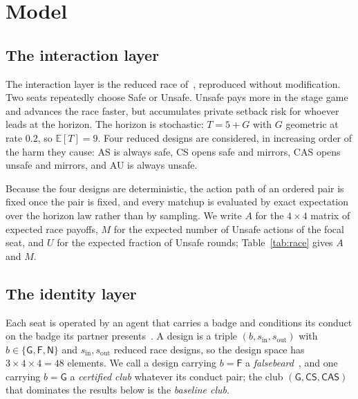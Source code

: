\documentclass[preprint,12pt]{elsarticle}
\theoremstyle{plain}
\theoremstyle{definition}
\newcommand{\AS}{\textsf{AS}}
\newcommand{\CS}{\textsf{CS}}
\newcommand{\CAS}{\textsf{CAS}}
\newcommand{\AU}{\textsf{AU}}
\begin{document}
\section{Model}
\label{sec:model}

\subsection{The interaction layer}
\label{sec:race}

The interaction layer is the reduced race of~\citet{domingos2026falling},
reproduced without modification. Two seats repeatedly choose Safe or Unsafe.
Unsafe pays more in the stage game and advances the race faster, but accumulates
private setback risk for whoever leads at the horizon. The horizon is
stochastic: $T = 5 + G$ with $G$ geometric at rate $0.2$, so $\mathbb{E}[T] = 9$.
Four reduced designs are considered, in increasing order of the harm they cause:
\AS{} is always safe, \CS{} opens safe and mirrors, \CAS{} opens unsafe and
mirrors, and \AU{} is always unsafe.

Because the four designs are deterministic, the action path of an ordered pair
is fixed once the pair is fixed, and every matchup is evaluated by exact
expectation over the horizon law rather than by sampling. We write $A$ for the
$4 \times 4$
matrix of expected race payoffs, $M$ for the expected number of Unsafe actions
of the focal seat, and $U$ for the expected fraction of Unsafe rounds;
Table~\ref{tab:race} gives $A$ and $M$.

\subsection{The identity layer}
\label{sec:identity}

Each seat is operated by an agent that carries a badge and conditions its
conduct on the badge its partner
presents~\citep{long2025mirror,wang2026outgroup}. A design is a triple
$(b, s_{\mathrm{in}}, s_{\mathrm{out}})$ with $b \in \{\mathsf{G}, \mathsf{F},
\mathsf{N}\}$ and $s_{\mathrm{in}}, s_{\mathrm{out}}$ reduced race designs, so
the design space has $3 \times 4 \times 4 = 48$ elements. We call a design
carrying $b = \mathsf{F}$ a \emph{falsebeard}~\citep{gardner2010greenbeards},
and one carrying $b = \mathsf{G}$ a \emph{certified club} whatever its conduct
pair; the club $(\mathsf{G}, \CS, \CAS)$ that dominates the results below is
the \emph{baseline club}.
\end{document}

